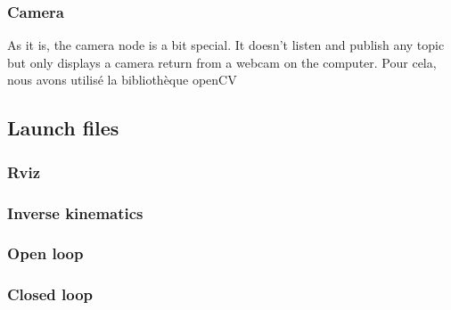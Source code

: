 \subsubsection{Camera}
As it is, the camera node is a bit special. It doesn't listen and publish any topic but only displays a camera return from a webcam on the computer. Pour cela, nous avons utilisé la bibliothèque openCV

\subsection{Launch files}
\subsubsection{Rviz}

\subsubsection{Inverse kinematics}

\subsubsection{Open loop}

\subsubsection{Closed loop}